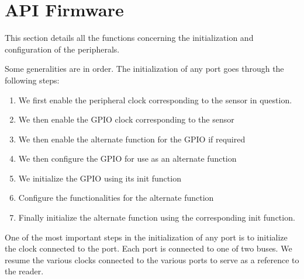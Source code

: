 \documentclass[11pt,a4paper]{report}
\begin{document}
\section{API Firmware} 

This section details all the functions concerning the initialization and configuration of the peripherals. 

Some generalities are in order. The initialization of any port goes through the following steps:

\begin{enumerate}
\item 
We first enable the peripheral clock corresponding to the sensor in question.
\item 
We then enable the GPIO clock corresponding to the sensor
\item 
We then enable the alternate function for the GPIO if required 
\item 
We then configure the GPIO for use as an alternate function 
\item 
We initialize the GPIO using its init function
\item 
Configure the functionalities for the alternate function 
\item 
Finally initialize the alternate function using the corresponding init function. 
\end{enumerate}

One of the most important steps in the initialization of any port is to initialize the clock connected to the port. Each port is connected to one of two buses. We resume the various clocks connected to the various ports to serve as a reference to the reader. 
\end{document}
